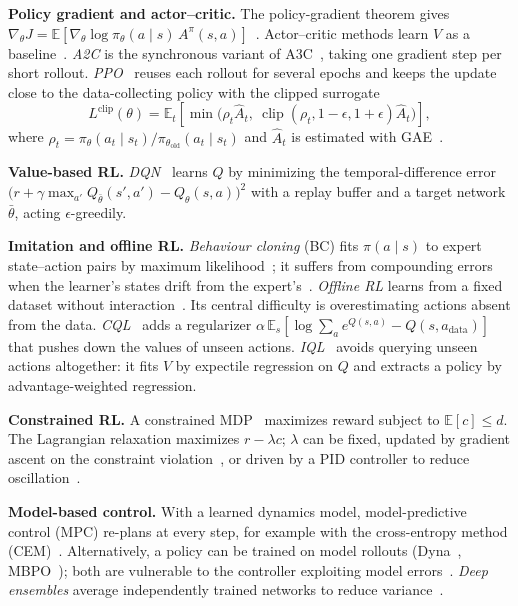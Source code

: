 \documentclass[conference]{IEEEtran}
\begin{document}
\textbf{Policy gradient and actor--critic.} The policy-gradient theorem gives $\nabla_\theta J = \mathbb{E}[\nabla_\theta \log \pi_\theta(a\mid s)\, A^\pi(s,a)]$~\cite{williams1992reinforce,sutton2018rl}. Actor--critic methods learn $V$ as a baseline~\cite{konda2000actorcritic}. \emph{A2C} is the synchronous variant of A3C~\cite{mnih2016a3c}, taking one gradient step per short rollout. \emph{PPO}~\cite{schulman2017ppo} reuses each rollout for several epochs and keeps the update close to the data-collecting policy with the clipped surrogate
\begin{equation}
L^{\text{clip}}(\theta)=\mathbb{E}_t\!\left[\min\!\big(\rho_t \hat A_t,\ \operatorname{clip}(\rho_t,1{-}\epsilon,1{+}\epsilon)\hat A_t\big)\right],
\end{equation}
where $\rho_t = \pi_\theta(a_t\mid s_t)/\pi_{\theta_{\text{old}}}(a_t\mid s_t)$ and $\hat A_t$ is estimated with GAE~\cite{schulman2016gae}.

\textbf{Value-based RL.} \emph{DQN}~\cite{mnih2015dqn} learns $Q$ by minimizing the temporal-difference error $\big(r + \gamma \max_{a'} Q_{\bar\theta}(s',a') - Q_\theta(s,a)\big)^2$ with a replay buffer and a target network $\bar\theta$, acting $\epsilon$-greedily.

\textbf{Imitation and offline RL.} \emph{Behaviour cloning} (BC) fits $\pi(a\mid s)$ to expert state--action pairs by maximum likelihood~\cite{pomerleau1989alvinn}; it suffers from compounding errors when the learner's states drift from the expert's~\cite{ross2011dagger}. \emph{Offline RL} learns from a fixed dataset without interaction~\cite{levine2020offline}. Its central difficulty is overestimating actions absent from the data. \emph{CQL}~\cite{kumar2020cql} adds a regularizer $\alpha\,\mathbb{E}_s[\log\sum_a e^{Q(s,a)} - Q(s,a_{\text{data}})]$ that pushes down the values of unseen actions. \emph{IQL}~\cite{kostrikov2022iql} avoids querying unseen actions altogether: it fits $V$ by expectile regression on $Q$ and extracts a policy by advantage-weighted regression.

\textbf{Constrained RL.} A constrained MDP~\cite{altman1999cmdp} maximizes reward subject to $\mathbb{E}[c] \le d$. The Lagrangian relaxation maximizes $r - \lambda c$; $\lambda$ can be fixed, updated by gradient ascent on the constraint violation~\cite{tessler2019rcpo}, or driven by a PID controller to reduce oscillation~\cite{stooke2020pid}.

\textbf{Model-based control.} With a learned dynamics model, model-predictive control (MPC) re-plans at every step, for example with the cross-entropy method (CEM)~\cite{rubinstein1997cem,chua2018pets}. Alternatively, a policy can be trained on model rollouts (Dyna~\cite{sutton1991dyna}, MBPO~\cite{janner2019mbpo}); both are vulnerable to the controller exploiting model errors~\cite{janner2019mbpo}. \emph{Deep ensembles} average independently trained networks to reduce variance~\cite{lakshminarayanan2017ensembles}.
\end{document}
